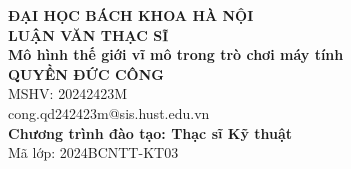 \documentclass[DoAn.tex]{subfiles}
\begin{document}
\begin{titlepage}
\thispagestyle{empty}
\begin{center}

{\textbf{\large{ĐẠI HỌC BÁCH KHOA HÀ NỘI}}}\\[4cm]

{\textbf{\huge{LUẬN VĂN THẠC SĨ}}}\\[1cm]
{\textbf{\Large{Mô hình thế giới vĩ mô trong trò chơi máy tính}}}\\[1cm]

{\textbf{\large{QUYỀN ĐỨC CÔNG}}}\\
{\large{MSHV: 20242423M}}\\
{\large{cong.qd242423m@sis.hust.edu.vn}}\\[0.5cm]

{\textbf{\large{Chương trình đào tạo: Thạc sĩ Kỹ thuật}}}\\
{\large{Mã lớp: 2024BCNTT-KT03}}\\

\vspace{4cm}
\begin{table}[H]
\centering
{}
\end{table}
\end{center}



\end{titlepage}
\end{document}
